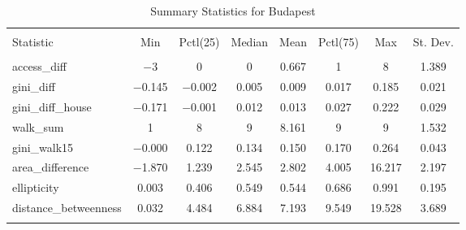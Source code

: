 
\begin{table}[!htbp] \centering 
  \caption{Summary Statistics for Budapest} 
  \label{} 
\begin{tabular}{@{\extracolsep{5pt}}lccccccc} 
\\[-1.8ex]\hline 
\hline \\[-1.8ex] 
Statistic & \multicolumn{1}{c}{Min} & \multicolumn{1}{c}{Pctl(25)} & \multicolumn{1}{c}{Median} & \multicolumn{1}{c}{Mean} & \multicolumn{1}{c}{Pctl(75)} & \multicolumn{1}{c}{Max} & \multicolumn{1}{c}{St. Dev.} \\ 
\hline \\[-1.8ex] 
access\_diff & $-$3 & 0 & 0 & 0.667 & 1 & 8 & 1.389 \\ 
gini\_diff & $-$0.145 & $-$0.002 & 0.005 & 0.009 & 0.017 & 0.185 & 0.021 \\ 
gini\_diff\_house & $-$0.171 & $-$0.001 & 0.012 & 0.013 & 0.027 & 0.222 & 0.029 \\ 
walk\_sum & 1 & 8 & 9 & 8.161 & 9 & 9 & 1.532 \\ 
gini\_walk15 & $-$0.000 & 0.122 & 0.134 & 0.150 & 0.170 & 0.264 & 0.043 \\ 
area\_difference & $-$1.870 & 1.239 & 2.545 & 2.802 & 4.005 & 16.217 & 2.197 \\ 
ellipticity & 0.003 & 0.406 & 0.549 & 0.544 & 0.686 & 0.991 & 0.195 \\ 
distance\_betweenness & 0.032 & 4.484 & 6.884 & 7.193 & 9.549 & 19.528 & 3.689 \\ 
\hline \\[-1.8ex] 
\end{tabular} 
\end{table} 

